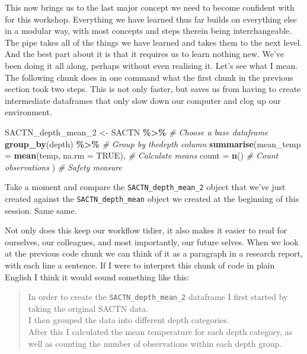 \documentclass[
]{book}
\newenvironment{Shaded}{\begin{snugshade}}{\end{snugshade}}
\newcommand{\CommentTok}[1]{\textcolor[rgb]{0.56,0.35,0.01}{\textit{#1}}}
\newcommand{\DataTypeTok}[1]{\textcolor[rgb]{0.13,0.29,0.53}{#1}}
\newcommand{\DecValTok}[1]{\textcolor[rgb]{0.00,0.00,0.81}{#1}}
\newcommand{\KeywordTok}[1]{\textcolor[rgb]{0.13,0.29,0.53}{\textbf{#1}}}
\newcommand{\NormalTok}[1]{#1}
\newcommand{\OperatorTok}[1]{\textcolor[rgb]{0.81,0.36,0.00}{\textbf{#1}}}
\newcommand{\OtherTok}[1]{\textcolor[rgb]{0.56,0.35,0.01}{#1}}
\newcommand{\StringTok}[1]{\textcolor[rgb]{0.31,0.60,0.02}{#1}}
\begin{document}
This now brings us to the last major concept we need to become confident with for this workshop. Everything we have learned thus far builds on everything else in a modular way, with most concepts and steps therein being interchangeable. The pipe takes all of the things we have learned and takes them to the next level. And the best part about it is that it requires us to learn nothing new. We've been doing it all along, perhaps without even realising it. Let's see what I mean. The following chunk does in one command what the first chunk in the previous section took two steps. This is not only faster, but saves us from having to create intermediate dataframes that only slow down our computer and clog up our environment.

\begin{Shaded}
\begin{Highlighting}[]
\NormalTok{SACTN\_depth\_mean\_}\DecValTok{2}\NormalTok{ <{-}}\StringTok{ }\NormalTok{SACTN }\OperatorTok{\%>\%}\StringTok{ }\CommentTok{\# Choose a base dataframe}
\StringTok{  }\KeywordTok{group\_by}\NormalTok{(depth) }\OperatorTok{\%>\%}\StringTok{ }\CommentTok{\# Group by thedepth column}
\StringTok{  }\KeywordTok{summarise}\NormalTok{(}\DataTypeTok{mean\_temp =} \KeywordTok{mean}\NormalTok{(temp, }\DataTypeTok{na.rm =} \OtherTok{TRUE}\NormalTok{), }\CommentTok{\# Calculate means}
  \DataTypeTok{count =} \KeywordTok{n}\NormalTok{() }\CommentTok{\# Count observations}
\NormalTok{) }\CommentTok{\# Safety measure}
\end{Highlighting}
\end{Shaded}

Take a moment and compare the \texttt{SACTN\_depth\_mean\_2} object that we've just created against the \texttt{SACTN\_depth\_mean} object we created at the beginning of this session. Same same.

Not only does this keep our workflow tidier, it also makes it easier to read for ourselves, our colleagues, and most importantly, our future selves. When we look at the previous code chunk we can think of it as a paragraph in a research report, with each line a sentence. If I were to interpret this chunk of code in plain English I think it would sound something like this:

\begin{quote}
In order to create the \texttt{SACTN\_depth\_mean\_2} dataframe I first started by taking the original SACTN data.\\
I then grouped the data into different depth categories.\\
After this I calculated the mean temperature for each depth category, as well as counting the number of observations within each depth group.
\end{quote}
\end{document}
